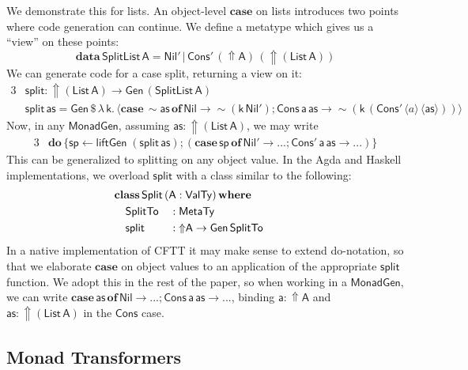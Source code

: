 \documentclass[acmsmall,screen,review,anonymous]{acmart}
\newcommand{\mit}[1]{{\mathsf{#1}}}
\newcommand{\msf}[1]{{\mathsf{#1}}}
\newcommand{\mbf}[1]{{\mathbf{#1}}}
\newcommand{\bs}[1]{\boldsymbol{#1}}
\newcommand{\mdo}{\mbf{do}\,}
\newcommand{\ind}{\hspace{1em}}
\newcommand{\lam}{\lambda\,}
\newcommand{\data}{\mbf{data}\,}
\newcommand{\where}{\mbf{where}}
\newcommand{\of}{\mbf{of}\,}
\newcommand{\vas}{\mathsf{as}}
\newcommand{\vk}{\mathsf{k}}
\newcommand{\vA}{\mathsf{A}}
\newcommand{\va}{\mathsf{a}}
\newcommand{\List}{\msf{List}}
\newcommand{\Nil}{\msf{Nil}}
\newcommand{\Cons}{\msf{Cons}}
\newcommand{\fro}{\leftarrow}
\newcommand{\case}{\mbf{case\,}}
\newcommand{\Lift}{{\Uparrow}}
\newcommand{\Up}{{\Uparrow}}
\newcommand{\spl}{{\bs{\sim}}}
\newcommand{\ql}{{\bs{\langle}}}
\newcommand{\qr}{{\bs{\rangle}}}
\newcommand{\MTy}{\msf{MetaTy}}
\newcommand{\VTy}{\msf{ValTy}}
\theoremstyle{remark}
\newcommand{\tyclass}{\mbf{class}}
\newcommand{\Gen}{\msf{Gen}}
\newcommand{\qt}[1]{\ql#1\qr}
\newcommand{\liftGen}{\mit{liftGen}}
\newcommand{\MonadGen}{\msf{MonadGen}}
\newcommand{\dlr}{\,\$\,}
\begin{document}
We demonstrate this for lists. An object-level $\mbf{case}$ on lists introduces
two points where code generation can continue. We define a metatype which gives
us a ``view'' on these points:
\[ \data \msf{SplitList}\,\vA = \Nil'\,|\,\Cons'\,(\Up \vA)\,(\Up (\List\,\vA)) \]
We can generate code for a case split, returning a view on it:
\begin{alignat*}{3}
  &\mit{split} : \Up (\List\,\vA) \to \Gen\,(\msf{SplitList}\,\vA)\\
  &\mit{split}\,\vas = \Gen \dlr \lam \vk.\,\qt{\case \spl \vas\,\of \Nil \to \spl(\vk\,\Nil'); \Cons\,\va\,\vas \to \spl(\vk\,(\Cons'\,\qt{a}\,\qt{\vas}))}
\end{alignat*}
Now, in any $\MonadGen$, assuming $\vas : \Up(\List\,\vA)$, we may write
\begin{alignat*}{3}
  &\mdo \{\mit{sp} \fro \liftGen\;(\!\mit{split}\,\vas);(\case \mit{sp}\,\of \Nil' \to ...;\Cons'\,\va\,\vas \to ...)\}
\end{alignat*}
This can be generalized to splitting on any object value. In the Agda and
Haskell implementations, we overload $\mit{split}$ with a class similar to the
following:
\begin{alignat*}{3}
  & \hspace{-2em}\mathrlap{\tyclass\,\mit{Split}\,(\vA : \VTy)\,\where}\\
  & \hspace{-2em}\ind \mit{SplitTo} &&: \MTy \\
  & \hspace{-2em}\ind \mit{split}   &&: \Lift \vA \to \Gen\,\mit{SplitTo}
\end{alignat*}
In a native implementation of CFTT it may make sense to extend do-notation, so
that we elaborate $\mbf{case}$ on object values to an application of the
appropriate $\mit{split}$ function. We adopt this in the rest of the paper, so
when working in a $\MonadGen$, we can write $\case \vas\,\of \Nil \to ...;
\Cons\,\va\,\vas \to ...$, binding $\va : \Up \vA$ and $\vas : \Up(\List\,\vA)$
in the $\Cons$ case.

\subsection{Monad Transformers}\label{monad-transformers}
\end{document}
